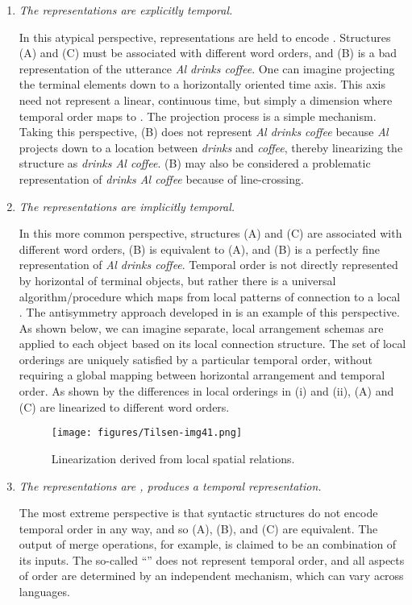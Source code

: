 \begin{enumerate}
\item \textit{The representations are explicitly temporal.}

  In this atypical perspective, representations are held to encode . Structures (A) and (C) must be associated with different word orders, and (B) is a bad representation of the utterance \textit{Al drinks coffee}. One can imagine projecting the terminal elements down to a horizontally oriented time axis. This axis need not represent a linear, continuous time, but simply a dimension where temporal order maps to . The projection process is a simple  mechanism. Taking this perspective, (B) does not represent \textit{Al drinks coffee} because \textit{Al} projects down to a location between \textit{drinks} and \textit{coffee}, thereby linearizing the structure as \textit{drinks Al coffee}. (B) may also be considered a problematic representation of \textit{drinks Al coffee} because of line-crossing.

\item \textit{The representations are implicitly temporal.}

  In this more common perspective, structures (A) and (C) are associated with different word orders, (B) is equivalent to (A), and (B) is a perfectly fine representation of \textit{Al drinks coffee}. Temporal order is not directly represented by horizontal  of terminal objects, but rather there is a universal algorithm/procedure which maps from local patterns of connection to a local . The antisymmetry approach developed in \citet{Kayne1994} is an example of this perspective. As shown below, we can imagine separate, local arrangement schemas are applied to each object based on its local connection structure. The set of local orderings are uniquely satisfied by a particular temporal order, without requiring a global mapping between horizontal arrangement and temporal order. As shown by the differences in local orderings in {}(i) and (ii), {}(A) and (C) are linearized to different word orders.

  
\begin{figure}
\texttt{[image: figures/Tilsen-img41.png]}
\caption{Linearization derived from local spatial relations.}
\label{fig:3:13}
\end{figure}
 

\item \textit{The representations are ,  produces a temporal representation.}

  The most extreme perspective is that syntactic structures do not encode temporal order in any way, and so (A), (B), and (C) are equivalent. The output of merge operations, for example, is claimed to be an  combination of its inputs. The so-called “” does not represent temporal order, and all aspects of order are determined by an independent  mechanism, which can vary across languages. 
\end{enumerate}


